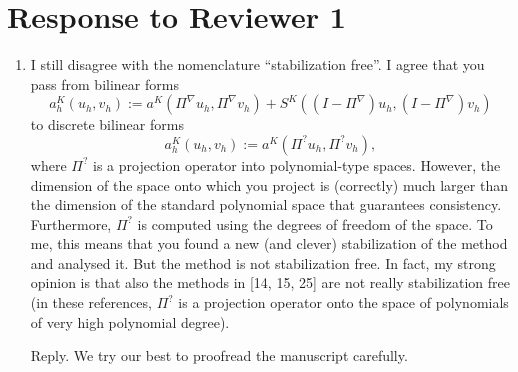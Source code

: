 \documentclass[10pt]{amsart}
\theoremstyle{definition}
\theoremstyle{remark}
\begin{document}
\section{Response to Reviewer 1}
\begin{enumerate}[1.]

\item \textsf{I still disagree with the nomenclature ``stabilization free''. I agree that you pass from bilinear forms
\begin{equation}\label{eq1}
a_h^K(u_h, v_h):= a^K(\Pi^{\nabla}u_h, \Pi^{\nabla}v_h) + S^K((I-\Pi^{\nabla})u_h, (I-\Pi^{\nabla})v_h)
\end{equation}
to discrete bilinear forms
$$
a_h^K(u_h, v_h):= a^K(\Pi^{?}u_h, \Pi^{?}v_h),
$$
where $\Pi^{?}$ is a projection operator into polynomial-type spaces. \vskip0.1cm
\noindent However, the dimension of the space onto which you project is (correctly) much larger than the dimension of the standard polynomial space that guarantees consistency.  \vskip0.1cm
\noindent 
Furthermore, $\Pi^{?}$ is computed using the degrees of freedom of the space. To me, this means that you found a new (and clever) stabilization of the method and analysed it. But the method is not stabilization free.  \vskip0.1cm
\noindent 
In fact, my strong opinion is that also the methods in [14, 15, 25] are not really stabilization free (in these references, $\Pi^{?}$ is a projection operator onto the space of polynomials of very high polynomial degree).
}

\smallskip \noindent \textcolor[rgb]{1.00,0.00,0.00}{Reply.}
We try our best to proofread the manuscript carefully.


\medskip


\end{enumerate}
\end{document}
